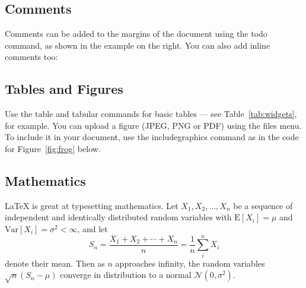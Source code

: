 \subsection{Comments}

Comments can be added to the margins of the document using the  todo command, as shown in the example on the right. You can also add inline comments too:


\subsection{Tables and Figures}

Use the table and tabular commands for basic tables --- see Table~\ref{tab:widgets}, for example. You can upload a figure (JPEG, PNG or PDF) using the files menu. To include it in your document, use the includegraphics command as in the code for Figure~\ref{fig:frog} below.



\subsection{Mathematics}

\LaTeX{} is great at typesetting mathematics. Let $X_1, X_2, \ldots, X_n$ be a sequence of independent and identically distributed random variables with $\text{E}[X_i] = \mu$ and $\text{Var}[X_i] = \sigma^2 < \infty$, and let
$$S_n = \frac{X_1 + X_2 + \cdots + X_n}{n}
      = \frac{1}{n}\sum_{i}^{n} X_i$$
denote their mean. Then as $n$ approaches infinity, the random variables $\sqrt{n}(S_n - \mu)$ converge in distribution to a normal $\mathcal{N}(0, \sigma^2)$.

